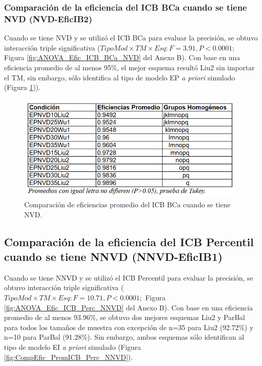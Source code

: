 \subsubsection{Comparación de la eficiencia del ICB BCa cuando se tiene NVD (NVD-EficIB2)}

Cuando se tiene NVD y se utilizó el ICB BCa para evaluar la precisión, se obtuvo interacción triple significativa ($TipoMod \times TM \times Esq: F=3.91, P<0.0001;$ Figura \ref{fig:ANOVA_Efic_ICB_BCa_NVD} del Anexo B). Con base en una eficiencia promedio de al menos 95\%, el mejor esquema resultó Liu2 sin importar el TM, sin embargo, sólo identifica al tipo de modelo EP \textit{a priori} simulado (Figura \ref{fig:CompEfic_PromICB_BCa_NVD})).\\

\begin{figure}[ht] 
	\centering 
	\includegraphics[width=0.76\linewidth]{img/CompEfic_PromICB_BCa_NVD.png} 
	\caption{Comparación de eficiencias promedio del ICB BCa cuando se tiene NVD.} 
	\label{fig:CompEfic_PromICB_BCa_NVD}
\end{figure}
\FloatBarrier



\subsection{Comparación de la eficiencia del ICB Percentil cuando se tiene NNVD (NNVD-EficIB1)}

Cuando se tiene NNVD y se utilizó el ICB Percentil para evaluar la precisión, se obtuvo interacción triple significativa ($TipoMod \times TM \times Esq: F=10.71, P<0.0001;$ Figura \ref{fig:ANOVA_Efic_ICB_Perc_NNVD} del Anexo B). Con base en una eficiencia promedio de al menos 93.96\%, se obtuvo dos mejores esquemas Liu2 y ParBal para todos los tamaños de muestra con excepción de n=35 para Liu2 (92.72\%) y n=10 para ParBal (91.28\%). Sin embargo, ambos esquemas sólo identifican al tipo de modelo EI \textit{a priori} simulado (Figura \ref{fig:CompEfic_PromICB_Perc_NNVD}).

